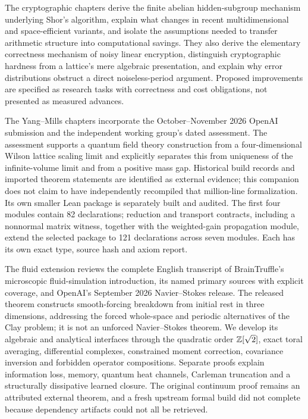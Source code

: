 The cryptographic chapters derive the finite abelian hidden-subgroup mechanism underlying Shor's algorithm, explain what changes in recent multidimensional and space-efficient variants, and isolate the assumptions needed to transfer arithmetic structure into computational savings. They also derive the elementary correctness mechanism of noisy linear encryption, distinguish cryptographic hardness from a lattice's mere algebraic presentation, and explain why error distributions obstruct a direct noiseless-period argument. Proposed improvements are specified as research tasks with correctness and cost obligations, not presented as measured advances.

The Yang--Mills chapters incorporate the October--November 2026 OpenAI submission and the independent working group's dated assessment. The assessment supports a quantum field theory construction from a four-dimensional Wilson lattice scaling limit and explicitly separates this from uniqueness of the infinite-volume limit and from a positive mass gap. Historical build records and imported theorem statements are identified as external evidence; this companion does not claim to have independently recompiled that million-line formalization. Its own smaller Lean package is separately built and audited. The first four modules contain 82 declarations; reduction and transport contracts, including a nonnormal matrix witness, together with the weighted-gain propagation module, extend the selected package to 121 declarations across seven modules. Each has its own exact type, source hash and axiom report.

The fluid extension reviews the complete English transcript of BrainTruffle's microscopic fluid-simulation introduction, its named primary sources with explicit coverage, and OpenAI's September 2026 Navier--Stokes release. The released theorem constructs smooth-forcing breakdown from initial rest in three dimensions, addressing the forced whole-space and periodic alternatives of the Clay problem; it is not an unforced Navier--Stokes theorem. We develop its algebraic and analytical interfaces through the quadratic order $\mathbb{Z}[\sqrt2]$, exact toral averaging, differential complexes, constrained moment correction, covariance inversion and forbidden operator compositions. Separate proofs explain information loss, memory, quantum heat channels, Carleman truncation and a structurally dissipative learned closure. The original continuum proof remains an attributed external theorem, and a fresh upstream formal build did not complete because dependency artifacts could not all be retrieved.

